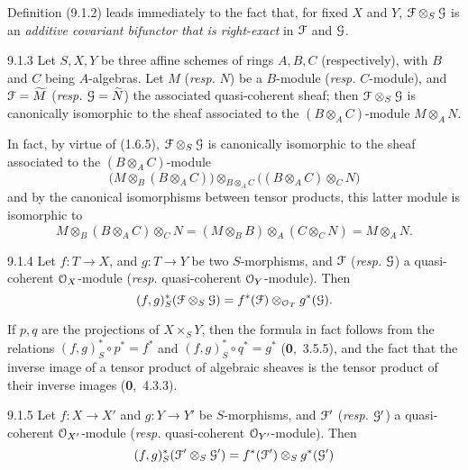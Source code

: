 \documentclass[../main.tex]{subfiles}
\begin{document}
Definition (9.1.2) leads immediately to the fact that, for fixed $X$ and $Y$, $\mathcal{F}\otimes_S\mathcal{G}$ is an \emph{additive covariant bifunctor that is right-exact} in $\mathcal{F}$ and $\mathcal{G}$.

\begin{cx}[Proposition]{9.1.3}
    Let $S,X,Y$ be three affine schemes of rings $A,B,C$ (respectively), with $B$ and $C$ being $A$-algebras.
    Let $M$ (\emph{resp.} $N$) be a $B$-module (\emph{resp.} $C$-module), and $\mathcal{F}=\widetilde{M}$ (\emph{resp.} $\mathcal{G}=\widetilde{N}$) the associated quasi-coherent sheaf; then $\mathcal{F}\otimes_S\mathcal{G}$ is canonically isomorphic to the sheaf associated to the $(B\otimes_A C)$-module $M\otimes_A N$.
\end{cx}

In fact, by virtue of (1.6.5), $\mathcal{F}\otimes_S\mathcal{G}$ is canonically isomorphic to the sheaf associated to the $(B\otimes_A C)$-module
\begin{equation*}
    \big( M\otimes_B(B\otimes_A C) \big) \otimes_{B\otimes_A C} \big( (B\otimes_A C)\otimes_C N \big)
\end{equation*}
and by the canonical isomorphisms between tensor products, this latter module is isomorphic to
\begin{equation*}
    M\otimes_B(B\otimes_A C)\otimes_C N = (M\otimes_B B)\otimes_A(C\otimes_C N) = M\otimes_A N.
\end{equation*}

\begin{cx}[Proposition]{9.1.4}
    Let $f\colon T\to X$, and $g\colon T\to Y$ be two $S$-morphisms, and $\mathcal{F}$ (\emph{resp.} $\mathcal{G}$) a quasi-coherent $\mathcal{O}_X$-module (\emph{resp.} quasi-coherent $\mathcal{O}_Y$-module).
    Then
    \begin{equation*}
        (f,g)^*_S(\mathcal{F}\otimes_S\mathcal{G}) = f^*(\mathcal{F})\otimes_{\mathcal{O}_T}g^*(\mathcal{G}).
    \end{equation*}
\end{cx}

If $p,q$ are the projections of $X\times_S Y$, then the formula in fact follows from the relations $(f,g)^*_S\circ p^*=f^*$ and $(f,g)^*_S\circ q^*=g^*$ (\textbf{0},~3.5.5), and the fact that the inverse image of a tensor product of algebraic sheaves is the tensor product of their inverse images (\textbf{0},~4.3.3).

\begin{cx}[Corollary]{9.1.5}
    Let $f\colon X\to X'$ and $g\colon Y\to Y'$ be $S$-morphisms, and $\mathcal{F}'$ (\emph{resp.} $\mathcal{G}'$) a quasi-coherent $\mathcal{O}_{X'}$-module (\emph{resp.} quasi-coherent $\mathcal{O}_{Y'}$-module).
    Then
    \begin{equation*}
        (f,g)^*_S(\mathcal{F}'\otimes_S\mathcal{G}') = f^*(\mathcal{F}')\otimes_S g^*(\mathcal{G}')
    \end{equation*}
\end{cx}
\end{document}
